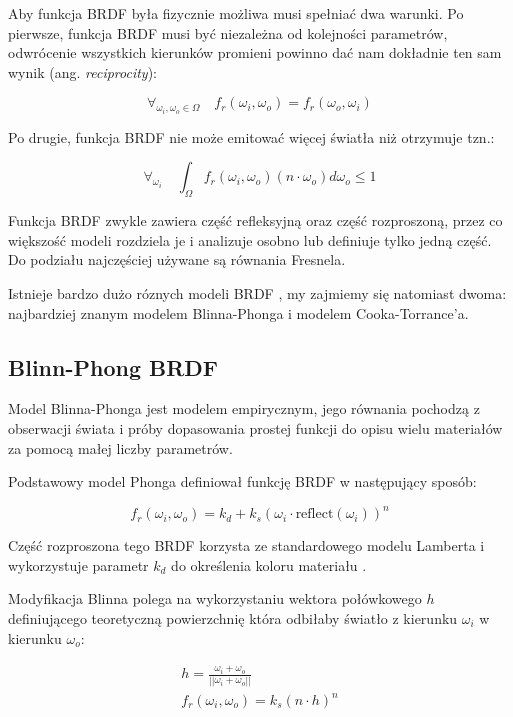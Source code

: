 \documentclass[../main.tex]{subfiles}
\begin{document}
Aby funkcja BRDF była fizycznie możliwa  musi spełniać dwa warunki. Po pierwsze, funkcja BRDF musi być
niezależna od kolejności parametrów, odwrócenie wszystkich kierunków promieni
powinno dać nam dokładnie ten sam wynik (ang. \textit{reciprocity}):

\[
  \forall_{\omega_i, \omega_o \in \Omega} \quad
  f_r(\omega_i, \omega_o) = f_r(\omega_o, \omega_i)
\]

Po drugie, funkcja BRDF nie może emitować więcej światła niż otrzymuje tzn.:

\[
  \forall_{\omega_i} \quad
  \int_{\Omega} {
    f_r(\omega_i, \omega_o)
    (n \cdot \omega_o)
    d\omega_o
  } \leq 1
\]

Funkcja BRDF zwykle zawiera część refleksyjną oraz część rozproszoną, przez co
większość modeli rozdziela je i analizuje osobno lub definiuje tylko jedną
część. Do podziału najczęściej używane są równania Fresnela.

Istnieje bardzo dużo róznych modeli BRDF \cite{brdf_overview}, my zajmiemy się
natomiast dwoma: najbardziej znanym modelem Blinna-Phonga i modelem
Cooka-Torrance'a.

\subsection{Blinn-Phong BRDF}

Model Blinna-Phonga jest modelem empirycznym, jego równania pochodzą z
obserwacji świata i próby dopasowania prostej funkcji do opisu wielu materiałów
za pomocą małej liczby parametrów.

Podstawowy model Phonga definiował funkcję BRDF w następujący sposób:

\[
f_r(\omega_i, \omega_o) =
  k_d + k_s \left(
    \omega_i \cdot
    \text{reflect}\left(\omega_i\right)
  \right)^{n}
\]

Część rozproszona tego BRDF korzysta ze standardowego modelu Lamberta i
wykorzystuje parametr $k_d$ do określenia koloru materiału .

Modyfikacja Blinna polega na wykorzystaniu wektora połówkowego $h$
definiującego teoretyczną powierzchnię która odbiłaby światło z kierunku
$\omega_i$ w kierunku $\omega_o$:

\begin{gather*}
  h = \frac{\omega_i + \omega_o}{||\omega_i+\omega_o||} \\
  f_r(\omega_i, \omega_o) = k_s (n \cdot h)^{n}
\end{gather*}
\end{document}
